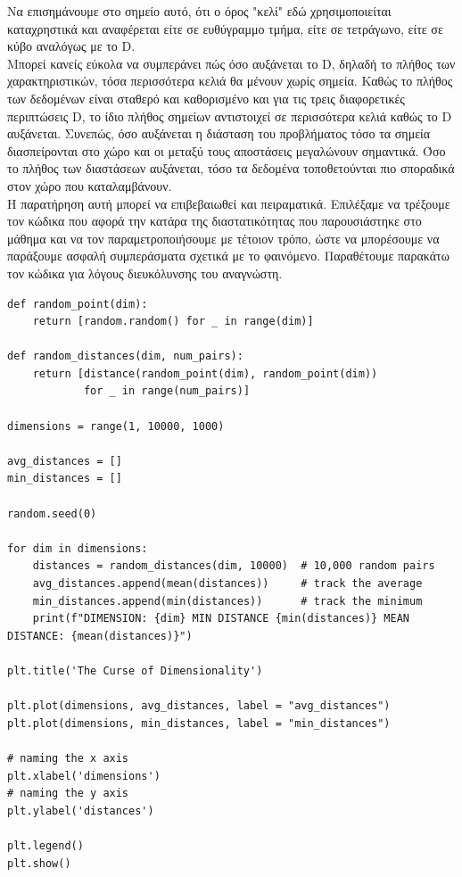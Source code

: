 \documentclass[12pt]{article}
\begin{document}
Να επισημάνουμε στο σημείο αυτό, ότι ο όρος "κελί" εδώ χρησιμοποιείται καταχρηστικά και αναφέρεται είτε σε ευθύγραμμο τμήμα, είτε σε τετράγωνο, είτε σε κύβο αναλόγως με το D. \\

Μπορεί κανείς εύκολα να συμπεράνει πώς όσο αυξάνεται το D, δηλαδή το πλήθος των χαρακτηριστικών, τόσα περισσότερα κελιά θα μένουν χωρίς σημεία. Καθώς το πλήθος των δεδομένων είναι σταθερό και καθορισμένο και για τις τρεις διαφορετικές περιπτώσεις D, το ίδιο πλήθος σημείων αντιστοιχεί σε περισσότερα κελιά καθώς το D αυξάνεται. Συνεπώς, όσο αυξάνεται η διάσταση του προβλήματος τόσο τα σημεία διασπείρονται στο χώρο και οι μεταξύ τους αποστάσεις μεγαλώνουν σημαντικά. Όσο το πλήθος των διαστάσεων αυξάνεται, τόσο τα δεδομένα τοποθετούνται πιο σποραδικά στον χώρο που καταλαμβάνουν. \\

Η παρατήρηση αυτή μπορεί να επιβεβαιωθεί και πειραματικά. Επιλέξαμε να τρέξουμε τον κώδικα που αφορά την κατάρα της διαστατικότητας που παρουσιάστηκε στο μάθημα και να τον παραμετροποιήσουμε με τέτοιον τρόπο, ώστε να μπορέσουμε να παράξουμε ασφαλή συμπεράσματα σχετικά με το φαινόμενο. Παραθέτουμε παρακάτω τον κώδικα για λόγους διευκόλυνσης του αναγνώστη. \\ 

\begin{lstlisting}
def random_point(dim):
	return [random.random() for _ in range(dim)]

def random_distances(dim, num_pairs):
	return [distance(random_point(dim), random_point(dim))
			for _ in range(num_pairs)]

dimensions = range(1, 10000, 1000)

avg_distances = []
min_distances = []

random.seed(0)

for dim in dimensions:
	distances = random_distances(dim, 10000)  # 10,000 random pairs
	avg_distances.append(mean(distances))     # track the average
	min_distances.append(min(distances))      # track the minimum
	print(f"DIMENSION: {dim} MIN DISTANCE {min(distances)} MEAN DISTANCE: {mean(distances)}")

plt.title('The Curse of Dimensionality') 

plt.plot(dimensions, avg_distances, label = "avg_distances")
plt.plot(dimensions, min_distances, label = "min_distances")

# naming the x axis 
plt.xlabel('dimensions') 
# naming the y axis 
plt.ylabel('distances')

plt.legend()     
plt.show()            
\end{lstlisting}
\end{document}
